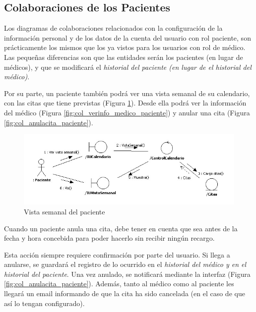 	
	\newpage
	\subsection{Colaboraciones de los Pacientes} %
	\label{sub:colaboraciones_de_los_pacientes}
				
		Los diagramas de colaboraciones relacionados con la configuración de la información personal y de los datos de la cuenta del usuario con rol paciente, son prácticamente los mismos que los ya vistos para los usuarios con rol de médico. Las pequeñas diferencias son que las entidades serán los pacientes (en lugar de médicos), y que se modificará el \textit{historial del paciente (en lugar de el historial del médico)}.
		
		Por su parte, un paciente también podrá ver una vista semanal de su calendario, con las citas que tiene previstas (Figura \ref{fig:col_vistasemanal_paciente}). Desde ella podrá ver la información del médico (Figura \ref{fig:col_verinfo_medico_paciente}) y anular una cita (Figura \ref{fig:col_anulacita_paciente}).
		
		\bigskip
		\bigskip
		\begin{figure}[H]
		  \centering
		    \includegraphics[width=16cm]{img/jpg/colaboraciones/25_VistaSemanalPaciente.jpg}
		  \caption{Vista semanal del paciente}
		  \label{fig:col_vistasemanal_paciente}
		\end{figure}
		
		\bigskip
		\bigskip
		
		Cuando un paciente anula una cita, debe tener en cuenta que sea antes de la fecha y hora concebida para poder hacerlo sin recibir ningún recargo. 
		
		Esta acción siempre requiere confirmación por parte del usuario. Si llega a anularse, se guardará el registro de lo ocurrido en el \textit{historial del médico y en el historial del paciente}. Una vez anulado, se notificará mediante la interfaz (Figura \ref{fig:col_anulacita_paciente}). Además, tanto al médico como al paciente les llegará un email informando de que la cita ha sido cancelada (en el caso de que así lo tengan configurado).
		
